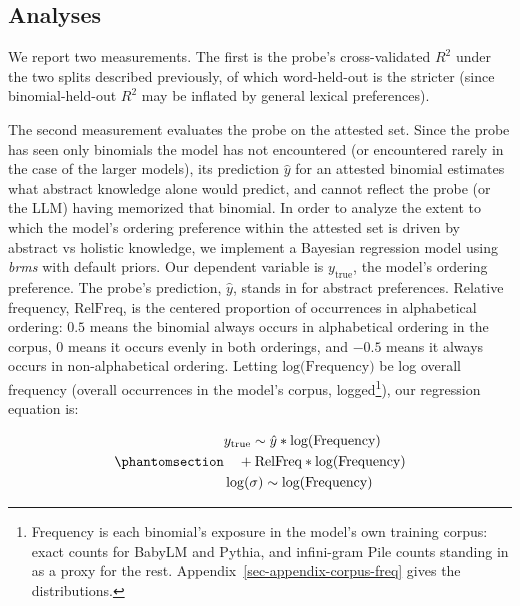 \documentclass[11pt]{article}
\begin{document}
\subsection{Analyses}\label{sec-methods-analyses}

We report two measurements. The first is the probe's cross-validated
\(R^2\) under the two splits described previously, of which
word-held-out is the stricter (since binomial-held-out \(R^2\) may be
inflated by general lexical preferences).

The second measurement evaluates the probe on the attested set. Since
the probe has seen only binomials the model has not encountered (or
encountered rarely in the case of the larger models), its prediction
\(\hat{y}\) for an attested binomial estimates what abstract knowledge
alone would predict, and cannot reflect the probe (or the LLM) having
memorized that binomial. In order to analyze the extent to which the
model's ordering preference within the attested set is driven by
abstract vs holistic knowledge, we implement a Bayesian regression model
using \emph{brms} \citep{burkner2017brms} with default priors. Our
dependent variable is \(y_{\text{true}}\), the model's ordering
preference. The probe's prediction, \(\hat{y}\), stands in for abstract
preferences. Relative frequency, \(\text{RelFreq}\), is the centered
proportion of occurrences in alphabetical ordering: \(0.5\) means the
binomial always occurs in alphabetical ordering in the corpus, \(0\)
means it occurs evenly in both orderings, and \(-0.5\) means it always
occurs in non-alphabetical ordering. Letting \(\text{log(Frequency)}\)
be log overall frequency (overall occurrences in the model's corpus,
logged\footnote{Frequency is each binomial's exposure in the model's own
  training corpus: exact counts for BabyLM
  \citep{warstadt-etal-2023-findings} and Pythia, and infini-gram Pile
  counts \citep{gao2020pile, liu2024infinigram} standing in as a proxy
  for the rest. Appendix~\ref{sec-appendix-corpus-freq} gives the
  distributions.}), our regression equation is:

\begin{equation}\phantomsection\label{eq-relfreq}{
\begin{aligned}
& y_{\text{true}} \sim \hat{y} * \text{log(Frequency)} \\ & \quad + \text{RelFreq} * \text{log(Frequency)} \\ & \log(\sigma) \sim \text{log(Frequency)}
\end{aligned}
}\end{equation}
\end{document}
